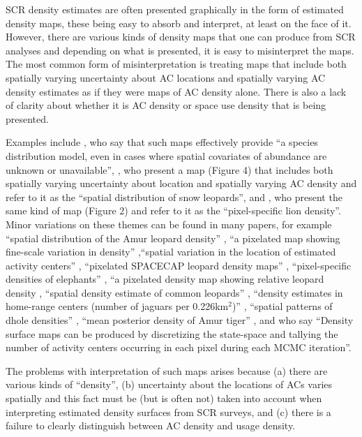 \documentclass[useAMS,usenatbib,referee]{biom}
\begin{document}
SCR density estimates are often presented graphically in the form of estimated density maps, these being easy to absorb and interpret, at least on the face of it.  However, there are various kinds of density maps that one can produce from SCR analyses and depending on what is presented, it is easy to misinterpret the maps. The most common form of misinterpretation is treating maps that include both spatially varying uncertainty about AC locations and spatially varying AC density estimates as if they were maps of AC density alone. There is also a lack of clarity about whether it is AC density or space use density that is being presented.

Examples include \cite{Dorazio+Karanth:17}, who say that such maps effectively provide  ``a species distribution model, even in cases where spatial covariates of abundance are unknown or unavailable'', \cite{Alexander+al:15}, who present a map (Figure 4) that includes both spatially varying uncertainty about location and spatially varying AC density and refer to it as the ``spatial distribution of snow leopards'', and \cite{Elliot+Gopalaswamy:16}, who present the same kind of map (Figure 2) and refer to it as the ``pixel-specific lion density''. Minor variations on these themes can be found in many papers, for example ``spatial distribution of the Amur leopard density'' \citep{Qi2015}, ``a pixelated map showing fine-scale variation in density'' \citep{Fouche2020},``spatial variation in the location of estimated activity centers'' \citep{Blanc2013}, ``pixelated SPACECAP leopard density maps'' \citep{Devens2021}, ``pixel-specific densities of elephants'' \citep{Goswami2019}, ``a pixelated density map showing relative leopard density \citep{Kandel2020}, ``spatial density estimate of common leopards'' \citep{Goldberg2015}, ``density estimates in home-range centers (number of jaguars per 0.226km$^2$)'' \citep{Lavariega2020}, ``spatial patterns of dhole densities'' \citep{Srivathsa2021}, ``mean posterior density of Amur tiger'' \citep{Xiao2016}, and \cite{Chandler+Royle:13} who say ``Density surface maps can be produced by discretizing the state-space and tallying the number of activity centers occurring in each pixel during each MCMC iteration''.

The problems with interpretation of such maps arises because (a) there are various kinds of ``density'', (b) uncertainty about the locations of ACs varies spatially and this fact must be (but is often not) taken into account when interpreting estimated density surfaces from SCR surveys, and (c) there is a failure to clearly distinguish between AC density and usage density.
\end{document}
